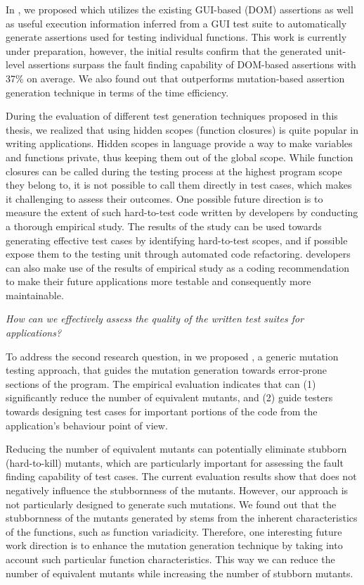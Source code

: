 In , we proposed \atrina which utilizes the existing GUI-based (\ie DOM) assertions as well as useful execution information inferred from a GUI test suite to automatically generate assertions used for testing individual functions. This work is currently under preparation, however, the initial results confirm that the generated unit-level assertions surpass the fault finding capability of DOM-based assertions with 37\% on average. We also found out that \atrina outperforms mutation-based assertion generation technique in terms of the time efficiency.

During the evaluation of different test generation techniques proposed in this thesis, we realized that using hidden scopes (\ie function closures) is quite popular in writing \javascript applications. 
Hidden scopes in \javascript language provide a way to make variables and functions private, thus keeping them out of the global scope.
While function closures can be called during the testing process at the highest program scope they belong to, it is not possible to call them directly in test cases, which makes it challenging to assess their outcomes.
One possible future direction is to measure the extent of such hard-to-test code written by developers by conducting a thorough empirical study.
The results of the study can be used towards generating effective test cases by identifying hard-to-test scopes, and if possible expose them to the testing unit through automated code refactoring. \javascript developers can also make use of the results of empirical study as a coding recommendation to make their future applications more testable and consequently more maintainable.


\emph{How can we effectively assess the quality of the written test suites for \javascript applications?}

To address the second research question, in  we proposed \mutandis, a generic mutation testing approach, that guides the mutation generation towards error-prone sections of the program. The empirical evaluation indicates that \mutandis can (1) significantly reduce the number of equivalent mutants, and (2) guide testers towards designing test cases for important portions of the code from the application's behaviour point of view. 

Reducing the number of equivalent mutants can potentially eliminate stubborn (hard-to-kill) mutants, which are particularly important for assessing the fault finding capability of test cases. The current evaluation results show that \mutandis does not negatively influence the stubbornness of the mutants.
However, our approach is not particularly designed to generate such mutations.
We found out that the stubbornness of the mutants generated by \mutandis stems from the inherent characteristics of the \javascript functions, such as function variadicity. Therefore, one interesting future work direction is to enhance the mutation generation technique by taking into account such particular function characteristics. This way we can reduce the number of equivalent mutants while increasing the number of stubborn mutants.

